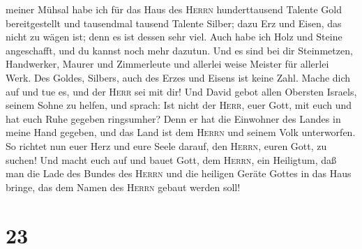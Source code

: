 meiner Mühsal habe ich für das Haus des \textsc{Herrn} hunderttausend
Talente Gold bereitgestellt und tausendmal tausend Talente Silber; dazu
Erz und Eisen, das nicht zu wägen ist; denn es ist dessen sehr viel.
Auch habe ich Holz und Steine angeschafft, und du kannst noch mehr
dazutun.  Und es sind bei dir Steinmetzen, Handwerker,
Maurer und Zimmerleute und allerlei weise Meister für allerlei Werk.
 Des Goldes, Silbers, auch des Erzes und Eisens ist keine
Zahl. Mache dich auf und tue es, und der \textsc{Herr} sei mit dir!
 Und David gebot allen Obersten Israels, seinem Sohne zu
helfen, und sprach:  Ist nicht der \textsc{Herr}, euer
Gott, mit euch und hat euch Ruhe gegeben ringsumher? Denn er hat die
Einwohner des Landes in meine Hand gegeben, und das Land ist dem
\textsc{Herrn} und seinem Volk unterworfen.  So richtet
nun euer Herz und eure Seele darauf, den \textsc{Herrn}, euren Gott, zu
suchen! Und macht euch auf und bauet Gott, dem \textsc{Herrn}, ein
Heiligtum, daß man die Lade des Bundes des \textsc{Herrn} und die
heiligen Geräte Gottes in das Haus bringe, das dem Namen des
\textsc{Herrn} gebaut werden soll!

\hypertarget{section-22}{%
\section{23}\label{section-22}}


